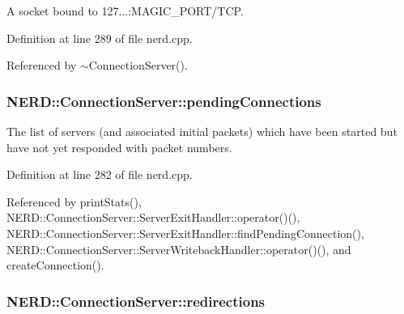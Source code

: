 \-A socket bound to 127...\-:\-M\-A\-G\-I\-C\-\_\-\-P\-O\-R\-T/\-T\-C\-P. 



\-Definition at line 289 of file nerd.\-cpp.



\-Referenced by $\sim$\-Connection\-Server().

\hypertarget{classNERD_1_1ConnectionServer_ad051d0ac714b53904e86c368cd90275c}{
\subsubsection[{pending\-Connections}]{ {\bf \-N\-E\-R\-D\-::\-Connection\-Server\-::pending\-Connections}}}
\label{classNERD_1_1ConnectionServer_ad051d0ac714b53904e86c368cd90275c}


\-The list of servers (and associated initial packets) which have been started but have not yet responded with packet numbers. 



\-Definition at line 282 of file nerd.\-cpp.



\-Referenced by print\-Stats(), \-N\-E\-R\-D\-::\-Connection\-Server\-::\-Server\-Exit\-Handler\-::operator()(), \-N\-E\-R\-D\-::\-Connection\-Server\-::\-Server\-Exit\-Handler\-::find\-Pending\-Connection(), \-N\-E\-R\-D\-::\-Connection\-Server\-::\-Server\-Writeback\-Handler\-::operator()(), and create\-Connection().

\hypertarget{classNERD_1_1ConnectionServer_a4186be4b373165c72ab81a73165cb075}{
\subsubsection[{redirections}]{ {\bf \-N\-E\-R\-D\-::\-Connection\-Server\-::redirections}}}
\label{classNERD_1_1ConnectionServer_a4186be4b373165c72ab81a73165cb075}


